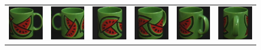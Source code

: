 \begin{figure}[p]
\begin{center}
\begin{tabular}{cccccc}
\includegraphics[width=2cm]{coil/beeld-30.eps} &
\includegraphics[width=2cm]{coil/beeld-31.eps} &
\includegraphics[width=2cm]{coil/beeld-32.eps} &
\includegraphics[width=2cm]{coil/beeld-33.eps} &
\includegraphics[width=2cm]{coil/beeld-34.eps} &
\includegraphics[width=2cm]{coil/beeld-35.eps} \\


\end{tabular}
\end{center}
\end{figure}
